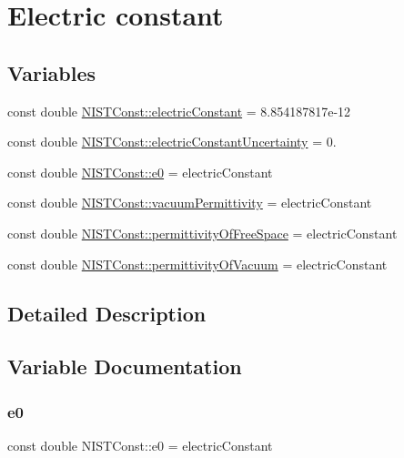 \hypertarget{group___electric_constant}{}\section{Electric constant}
\label{group___electric_constant}
\subsection*{Variables}
\begin{DoxyCompactItemize}
\item 
const double \hyperlink{group___electric_constant_gae5a425228125285727dd53333725ef76}{N\+I\+S\+T\+Const\+::electric\+Constant} = 8.\+854187817e-\/12
\item 
const double \hyperlink{group___electric_constant_gaf65e89a9fe674a6f80f5a66bbe101aab}{N\+I\+S\+T\+Const\+::electric\+Constant\+Uncertainty} = 0.
\item 
const double \hyperlink{group___electric_constant_ga6fa2aaf171b8dafe96bbd87c7aa95f59}{N\+I\+S\+T\+Const\+::e0} = electric\+Constant
\item 
const double \hyperlink{group___electric_constant_ga46294f940b4149602e7bef336431c7dd}{N\+I\+S\+T\+Const\+::vacuum\+Permittivity} = electric\+Constant
\item 
const double \hyperlink{group___electric_constant_ga56d0b5b81201a3a81b724d45a4a73b81}{N\+I\+S\+T\+Const\+::permittivity\+Of\+Free\+Space} = electric\+Constant
\item 
const double \hyperlink{group___electric_constant_ga81378e87b977f5b3403002e187d3d22c}{N\+I\+S\+T\+Const\+::permittivity\+Of\+Vacuum} = electric\+Constant
\end{DoxyCompactItemize}


\subsection{Detailed Description}


\subsection{Variable Documentation}
\mbox{\label{group___electric_constant_ga6fa2aaf171b8dafe96bbd87c7aa95f59}} 
\subsubsection{\texorpdfstring{e0}{e0}}
{\footnotesize\ttfamily const double N\+I\+S\+T\+Const\+::e0 = electric\+Constant}


